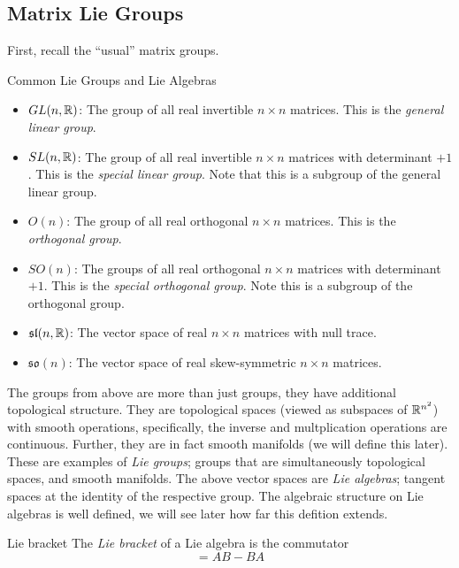 \subsection{Matrix Lie Groups}
First, recall the ``usual'' matrix groups.
\begin{boxdef}{Common Lie Groups and Lie Algebras}{}
    \begin{itemize}
        \item $GL(n, \mathbb{R})$: The group of all real invertible $n \times n$ matrices.
        This is the \textit{general linear group}.
        \item $SL(n, \mathbb{R})$: The group of all real invertible $n \times n$ matrices
        with determinant $+1$. This is the \textit{special linear group}. Note that
        this is a subgroup of the general linear group.
        \item $O(n)$: The group of all real orthogonal $n\times n$ matrices. This is the
        \textit{orthogonal group}.
        \item $SO(n)$: The groups of all real orthogonal $n\times n$ matrices with determinant
        $+1$. This is the \textit{special orthogonal group}. Note this is a subgroup
        of the orthogonal group.
        \item $\mathfrak{sl}(n, \mathbb{R})$: The vector space of real $n \times n$ matrices with
        null trace.
        \item $\mathfrak{so}(n)$: The vector space of real skew-symmetric $n \times n$
        matrices.
    \end{itemize}
\end{boxdef}

The groups from above are more than just groups, they have additional topological
structure. They are topological spaces (viewed as subspaces of $\mathbb{R}^{n^2}$) with
smooth operations, specifically, the inverse and multplication operations are 
continuous. Further, they are in fact smooth manifolds (we will define this later).
These are examples of \textit{Lie groups}; groups that are simultaneously topological
spaces, and smooth manifolds. The above vector spaces are \textit{Lie algebras};
tangent spaces at the identity of the respective group. The algebraic structure
on Lie algebras is well defined, we will see later how far this defition extends.

\begin{boxdef}{Lie bracket}{}
    The \textit{Lie bracket} of a Lie algebra is the commutator
    \begin{equation*}
        [A, B] = AB - BA
    \end{equation*}
\end{boxdef}

